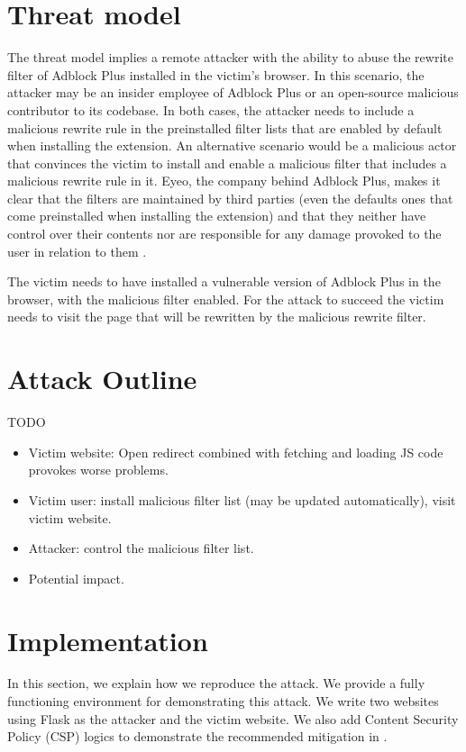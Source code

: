 \documentclass[conference]{IEEEtran}
\begin{document}
\section{Threat model}
The threat model implies a remote attacker with the ability to abuse the rewrite filter of Adblock Plus installed in the victim's browser. In this scenario, the attacker may be an insider employee of Adblock Plus or an open-source malicious contributor to its codebase. In both cases, the attacker needs to include a malicious rewrite rule in the preinstalled filter lists that are enabled by default when installing the extension. An alternative scenario would be a malicious actor that convinces the victim to install and enable a malicious filter that includes a malicious rewrite rule in it. Eyeo, the company behind Adblock Plus, makes it clear that the filters are maintained by third parties (even the defaults ones that come preinstalled when installing the extension) and that they neither have control over their contents nor are responsible for any damage provoked to the user in relation to them \cite{abp_suscriptions}.

The victim needs to have installed a vulnerable version of Adblock Plus in the browser, with the malicious filter enabled. For the attack to succeed the victim needs to visit the page that will be rewritten by the malicious rewrite filter.	
\section{Attack Outline}
TODO
\begin{itemize}
\item Victim website: Open redirect combined with fetching and loading JS code provokes worse problems.
\item Victim user: install malicious filter list (may be updated automatically), visit victim website.
\item Attacker: control the malicious filter list.
\item Potential impact.
\end{itemize}

\section{Implementation}
\label{sec:Implementation}

In this section, we explain how we reproduce the attack. We provide a fully functioning environment for demonstrating this attack. We write two websites using Flask as the attacker and the victim website. We also add Content Security Policy (CSP) logics to demonstrate the recommended mitigation in \cite{abp_code_injection}.
\end{document}
